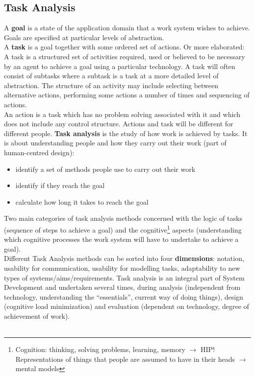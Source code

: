 \subsection{Task Analysis}
A \textbf{goal} is a state of the application domain that a work system wishes to achieve. Goals are specified at particular levels of abstraction. \\
A \textbf{task} is a goal together with some ordered set of actions. Or more elaborated:
A task is a structured set of activities required, used or believed to be necessary by an agent to achieve a goal using a particular technology. A task will often consist of subtasks where a subtask is a task at a more detailed level of abstraction. The structure of an activity may include selecting between alternative actions, performing some actions a number of times and sequencing of actions.\\
An action is a task which has no problem solving associated with it and which does not include any control structure. Actions and task will be different for different people.
\textbf{Task analysis} is the study of how work is achieved by tasks. It is about understanding people and how they carry out their work (part of human-centred design):
\begin{itemize}
\item identify a set of methods people use to carry out their work
\item identify if they reach the goal
\item calculate how long it takes to reach the goal
\end{itemize}
Two main categories of task analysis methods concerned with the logic of tasks (sequence of steps to achieve a goal) and the cognitive\footnote{Cognition: thinking, solving problems, learning, memory $\rightarrow$ HIP!\\ Representations of things that people are assumed to have in their heads $\rightarrow$ mental models} aspects (understanding which cognitive processes the work system will have to undertake to achieve a goal).\\
Different Task Analysis methods can be sorted into four \textbf{dimensions}: notation, usability for communication, usability for modelling tasks, adaptability to new types of systems/aims/requirements. Task analysis is an integral part of System Development and undertaken several times, during analysis (independent from technology, understanding the ``essentials'', current way of doing things), design (cognitive load minimization) and evaluation (dependent on technology, degree of achievement of work).\\ \\
